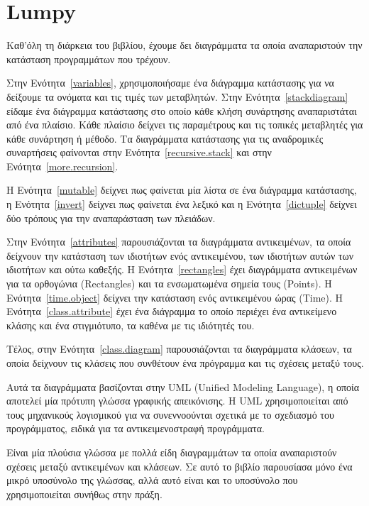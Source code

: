 \documentclass[10pt]{book}
\begin{document}
\chapter{Lumpy}
\label{lumpy}

 
Καθ'όλη τη διάρκεια του βιβλίου, έχουμε δει διαγράμματα τα οποία αναπαριστούν την κατάσταση προγραμμάτων
που τρέχουν.

Στην Ενότητα~\ref{variables}, χρησιμοποιήσαμε ένα διάγραμμα κατάστασης για να δείξουμε τα ονόματα και τις
τιμές των μεταβλητών.  Στην Ενότητα~\ref{stackdiagram} είδαμε ένα διάγραμμα κατάστασης στο οποίο κάθε κλήση
συνάρτησης αναπαριστάται από ένα πλαίσιο.  Κάθε πλαίσιο δείχνει τις παραμέτρους και τις τοπικές μεταβλητές
για κάθε συνάρτηση ή μέθοδο.  Τα διαγράμματα κατάστασης για τις αναδρομικές συναρτήσεις φαίνονται στην
Ενότητα~\ref{recursive.stack} και στην Ενότητα~\ref{more.recursion}.
 
 

Η Ενότητα~\ref{mutable} δείχνει πως φαίνεται μία λίστα σε ένα διάγραμμα κατάστασης, 
η Ενότητα~\ref{invert} δείχνει πως φαίνεται ένα λεξικό και η Ενότητα~\ref{dictuple} 
δείχνει δύο τρόπους για την αναπαράσταση των πλειάδων.

Στην Ενότητα~\ref{attributes} παρουσιάζονται τα διαγράμματα αντικειμένων, τα οποία 
δείχνουν την κατάσταση των ιδιοτήτων ενός αντικειμένου, των ιδιοτήτων αυτών των ιδιοτήτων και ούτω καθεξής.
Η Ενότητα~\ref{rectangles} έχει διαγράμματα αντικειμένων για τα ορθογώνια (Rectangles) και τα ενσωματωμένα
σημεία τους (Points).  Η Ενότητα~\ref{time.object} δείχνει την κατάσταση ενός αντικειμένου ώρας (Time).
Η Ενότητα~\ref{class.attribute} έχει ένα διάγραμμα το οποίο περιέχει ένα αντικείμενο κλάσης και ένα
στιγμιότυπο, τα καθένα με τις ιδιότητές του.

Τέλος, στην Ενότητα~\ref{class.diagram} παρουσιάζονται τα διαγράμματα κλάσεων, τα οποία δείχνουν τις κλάσεις
που συνθέτουν ένα πρόγραμμα και τις σχέσεις μεταξύ τους.

Αυτά τα διαγράμματα βασίζονται στην UML (Unified Modeling Language), η οποία αποτελεί μία πρότυπη γλώσσα
γραφικής απεικόνισης.  Η UML χρησιμοποιείται από τους μηχανικούς λογισμικού για να συνεννοούνται σχετικά
με το σχεδιασμό του προγράμματος, ειδικά για τα αντικειμενοστραφή προγράμματα.

Είναι μία πλούσια γλώσσα με πολλά είδη διαγραμμάτων τα οποία αναπαριστούν σχέσεις μεταξύ αντικειμένων και
κλάσεων.  Σε αυτό το βιβλίο παρουσίασα μόνο ένα μικρό υποσύνολο της γλώσσας, αλλά αυτό είναι και το
υποσύνολο που χρησιμοποιείται συνήθως στην πράξη.
\end{document}
